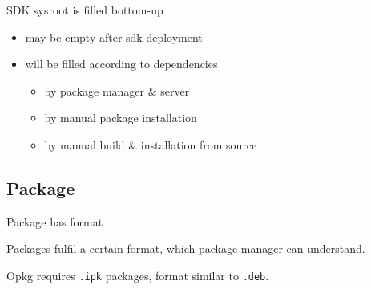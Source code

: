 \documentclass{beamer}
\begin{document}
\begin{frame}{SDK sysroot is filled bottom-up}
    \begin{block}{}
        \begin{itemize}
            \item{may be empty after sdk deployment}
            \item{will be filled according to dependencies}
            \begin{itemize}
                \item{by package manager \& server}
                \item{by manual package installation}
                \item{by manual build \& installation from source}
            \end{itemize}
        \end{itemize}
    \end{block}
\end{frame}

\subsection{Package}

\begin{frame}[fragile]{Package has format}
    \begin{block}{}
        Packages fulfil a certain format, which package manager can understand.
    \end{block}
    \begin{block}{}
        Opkg requires \verb|.ipk| packages, format similar to \verb|.deb|.
    \end{block}
\end{frame}
\end{document}
